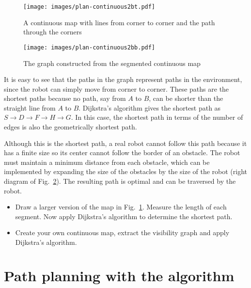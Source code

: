 \begin{figure}
\begin{center}
\texttt{[image: images/plan-continuous2bt.pdf]}
\end{center}
\caption{A continuous map with lines from corner to corner and the path through the corners}\label{fig.map-graph-bt}
\end{figure}

\begin{figure}
\begin{center}
\texttt{[image: images/plan-continuous2bb.pdf]}
\end{center}
\caption{The graph constructed from the segmented continuous map}\label{fig.map-graph-bb}
\end{figure}

It is easy to see that the paths in the graph represent paths in the environment, since the robot can simply move from corner to corner. These paths are the shortest paths because no path, say from $A$ to $B$, can be shorter than the straight line from $A$ to $B$. Dijkstra's algorithm gives the shortest path as $S\rightarrow D\rightarrow F\rightarrow H\rightarrow G$. In this case, the shortest path in terms of the number of edges is also the geometrically shortest path.

Although this is the shortest path, a real robot cannot follow this path because it has a finite size so its center cannot follow the border of an obstacle. The robot must maintain a minimum distance from each obstacle, which can be implemented by expanding the size of the obstacles by the size of the robot (right diagram of Fig.~\ref{fig.map-graph-bb}). The resulting path is optimal and can be traversed by the robot.

\begin{framed}
\begin{itemize}
\item Draw a larger version of the map in Fig.~\ref{fig.map-graph-bt}. Measure the length of each segment. Now apply Dijkstra's algorithm to determine the shortest path.
\item Create your own continuous map, extract the visibility graph and apply Dijkstra's algorithm.
\end{itemize}
\end{framed}

\section{Path planning with the \astar{} algorithm}\label{s.astar}

